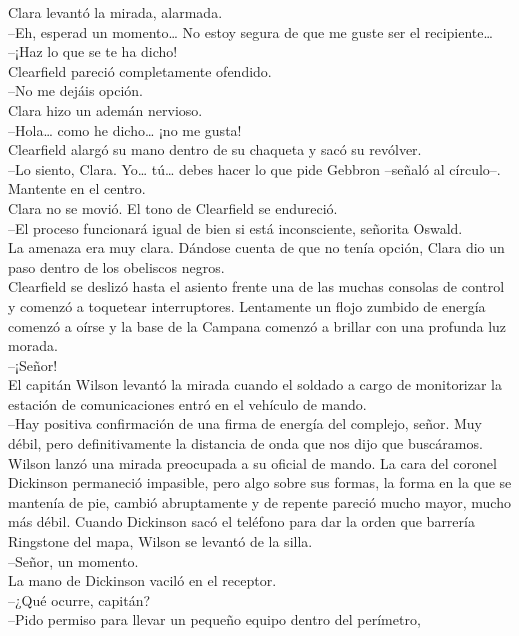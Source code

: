 Clara levantó la mirada, alarmada.\\
--Eh, esperad un momento\ldots{} No estoy segura de que me guste ser el
recipiente\ldots{}\\
--¡Haz lo que se te ha dicho!\\
Clearfield pareció completamente ofendido.\\
--No me dejáis opción.\\
Clara hizo un ademán nervioso.\\
--Hola\ldots{} como he dicho\ldots{} ¡no me gusta!\\
Clearfield alargó su mano dentro de su chaqueta y sacó su revólver.\\
--Lo siento, Clara. Yo\ldots{} tú\ldots{} debes hacer lo que pide
Gebbron --señaló al círculo--. Mantente en el centro.\\
Clara no se movió. El tono de Clearfield se endureció.\\
--El proceso funcionará igual de bien si está inconsciente, señorita
Oswald.\\
La amenaza era muy clara. Dándose cuenta de que no tenía opción, Clara
dio un paso dentro de los obeliscos negros.\\
Clearfield se deslizó hasta el asiento frente una de las muchas consolas
de control y comenzó a toquetear interruptores. Lentamente un flojo
zumbido de energía comenzó a oírse y la base de la Campana comenzó a
brillar con una profunda luz morada.\\[2\baselineskip]--¡Señor!\\
El capitán Wilson levantó la mirada cuando el soldado a cargo de
monitorizar la estación de comunicaciones entró en el vehículo de
mando.\\
--Hay positiva confirmación de una firma de energía del complejo, señor.
Muy débil, pero definitivamente la distancia de onda que nos dijo que
buscáramos.\\
Wilson lanzó una mirada preocupada a su oficial de mando. La cara del
coronel Dickinson permaneció impasible, pero algo sobre sus formas, la
forma en la que se mantenía de pie, cambió abruptamente y de repente
pareció mucho mayor, mucho más débil. Cuando Dickinson sacó el teléfono
para dar la orden que barrería Ringstone del mapa, Wilson se levantó de
la silla.\\
--Señor, un momento.\\
La mano de Dickinson vaciló en el receptor.\\
--¿Qué ocurre, capitán?\\
--Pido permiso para llevar un pequeño equipo dentro del perímetro,
